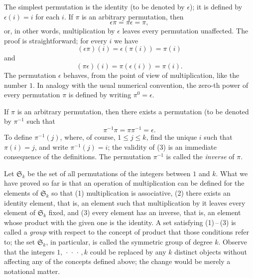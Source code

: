 The simplest permutation is the identity (to be denoted by \(\epsilon\)); it is
defined by \(\epsilon(i) = i\) for each \(i\). If \(\pi\) is an arbitrary
permutation, then
\begin{equation}
    \epsilon\pi = \pi\epsilon = \pi,
\end{equation}
or, in other words, multiplication by \(\epsilon\) leaves every permutation
unaffected. The proof is straightforward; for every \(i\) we have
\begin{equation*}
    (\epsilon\pi)(i) = \epsilon(\pi(i)) = \pi(i)
\end{equation*}
and
\begin{equation*}
    (\pi\epsilon)(i) = \pi(\epsilon(i)) = \pi(i).
\end{equation*}
The permutation \(\epsilon\) behaves, from the point of view of multiplication,
like the number \(1\). In analogy with the usual numerical convention, the
zero-th power of every permutation \(\pi\) is defined by writing \(\pi^0 =
\epsilon\).

If \(\pi\) is an arbitrary permutation, then there exists a permutation (to be
denoted by \(\pi^{-1}\) such that
\begin{equation}
    \pi^{-1}\pi = \pi\pi^{-1} = \epsilon.
\end{equation}
To define \(\pi^{-1}(j)\), where, of course, \(1 \leq j \leq k\), find the
unique \(i\) such that \(\pi(i) = j\), and write \(\pi^{-1}(j) = i\); the
validity of (3) is an immediate consequence of the definitions. The permutation
\(\pi^{-1}\) is called the \emph{inverse} of \(\pi\).

Let \(\mathfrak{S}_k\) be the set of all permutations of the integers between
\(1\) and \(k\). What we have proved so far is that an operation of
multiplication can be defined for the elements of \(\mathfrak{S}_k\) so that (1)
multiplication is associative, (2) there exists an identity element, that is, an
element such that multiplication by it leaves every element of
\(\mathfrak{S}_k\) fixed, and (3) every element has an inverse, that is, an
element whose product with the given one is the identity. A set satisfying
(1)\,--\,(3) is called a \emph{group} with respect to the concept of product
that those conditions refer to; the set \(\mathfrak{S}_k\), in particular, is
called the symmetric group of degree \(k\). Observe that the integers \(1,
\,\cdot\,\cdot\,\cdot\,, k\) could be replaced by any \(k\) distinct objects
without affecting any of the concepts defined above; the change would be merely
a notational matter.

